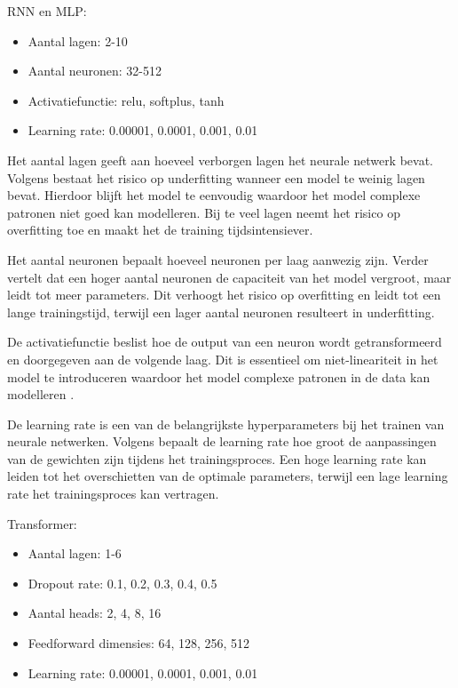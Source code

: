 RNN en MLP:

\begin{itemize}
    \item Aantal lagen: 2-10
    \item Aantal neuronen: 32-512
    \item Activatiefunctie: relu, softplus, tanh
    \item Learning rate: 0.00001, 0.0001, 0.001, 0.01
\end{itemize}

Het aantal lagen geeft aan hoeveel verborgen lagen het neurale netwerk bevat. Volgens \textcite{Seidi2025} bestaat het risico op underfitting wanneer een model te weinig lagen bevat. Hierdoor blijft het model te eenvoudig waardoor het model complexe patronen niet goed kan modelleren. Bij te veel lagen neemt het risico op overfitting toe en maakt het de training tijdsintensiever.

Het aantal neuronen bepaalt hoeveel neuronen per laag aanwezig zijn. Verder vertelt \textcite{Seidi2025} dat een hoger aantal neuronen de capaciteit van het model vergroot, maar leidt tot meer parameters. Dit verhoogt het risico op overfitting en leidt tot een lange trainingstijd, terwijl een lager aantal neuronen resulteert in underfitting.

De activatiefunctie beslist hoe de output van een neuron wordt getransformeerd en doorgegeven aan de volgende laag. Dit is essentieel om niet-lineariteit in het model te introduceren waardoor het model complexe patronen in de data kan modelleren \autocite{Gustineli2022}.

De learning rate is een van de belangrijkste hyperparameters bij het trainen van neurale netwerken. Volgens \textcite{Wu2019} bepaalt de learning rate hoe groot de aanpassingen van de gewichten zijn tijdens het trainingsproces. Een hoge learning rate kan leiden tot het overschietten van de optimale parameters, terwijl een lage learning rate het trainingsproces kan vertragen.

Transformer:

\begin{itemize}
    \item Aantal lagen: 1-6
    \item Dropout rate: 0.1, 0.2, 0.3, 0.4, 0.5
    \item Aantal heads: 2, 4, 8, 16
    \item Feedforward dimensies: 64, 128, 256, 512
    \item Learning rate: 0.00001, 0.0001, 0.001, 0.01
\end{itemize}

